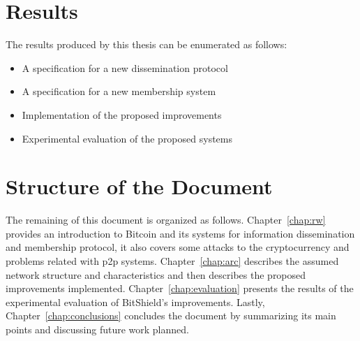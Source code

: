 

\section{Results}
The results produced by this thesis can be enumerated as follows:
\begin{itemize}
  \item A specification for a new dissemination protocol
  \item A specification for a new membership system
  \item Implementation of the proposed improvements
  \item Experimental evaluation of the proposed systems
\end{itemize}

\section{Structure of the Document}
The remaining of this document is organized as follows. Chapter~\ref{chap:rw} provides an introduction to Bitcoin and its systems for information dissemination and membership protocol, it also covers some attacks to the cryptocurrency and problems related with \acrlong{p2p} systems. Chapter~\ref{chap:arc} describes the assumed network structure and characteristics and then describes the proposed improvements implemented. Chapter~\ref{chap:evaluation} presents the results of the experimental evaluation of BitShield's improvements. Lastly, Chapter~\ref{chap:conclusions} concludes the document by summarizing its main points and discussing future work planned.


